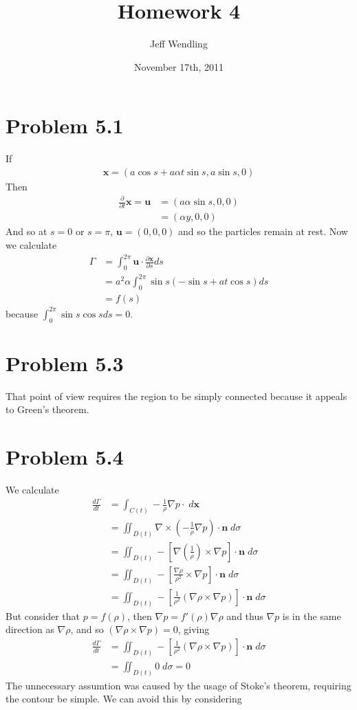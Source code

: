 \documentclass[12pt]{article}
\title{Homework 4}
\author{Jeff Wendling}
\date{November 17th, 2011}
\newcommand{\eq}[1]{\begin{align*}#1\end{align*}}
\newcommand{\p}[2]{\frac{\partial#1}{\partial#2}}
\newcommand{\de}[2]{\frac{d#1}{d#2}}
\begin{document}
\maketitle
\section*{Problem 5.1}
If
\eq{
	\bm{x} = (a\cos s + a\alpha t\sin s, a \sin s, 0)
}
Then
\eq{
	\p{}{t}\bm{x} = \bm{u} &= (a\alpha\sin s, 0, 0)\\
	&= (\alpha y, 0, 0)
}
And so at $s = 0$ or $s = \pi$, $\bm{u} = (0, 0, 0)$ and so the particles remain at rest.
Now we calculate
\eq{
	\Gamma &= \int_0^{2\pi} \bm{u}\cdot \p{\bm{x}}{s} ds\\
	&= a^2\alpha \int_0^{2\pi} \sin s(-\sin s + at\cos s)ds\\
	&= f(s)
}
because $\int_0^{2\pi} \sin s \cos s ds = 0$.
\section*{Problem 5.3}
That point of view requires the region to be simply connected because it appeals to Green's theorem.
\section*{Problem 5.4}
We calculate
\eq{
	\de{\Gamma}{t} &= \int_{C(t)} -\frac{1}{\rho}\nabla p \cdot\;d\bm{x}\\
	&= \iint_{D(t)} \nabla \times (-\frac{1}{\rho}\nabla p)\cdot \bm{n}\;d\sigma\\
	&= \iint_{D(t)} -\left[\nabla(\frac{1}{\rho}) \times \nabla p\right]\cdot \bm{n}\;d\sigma\\
	&= \iint_{D(t)} -\left[\frac{\nabla \rho}{\rho^2} \times \nabla p\right]\cdot \bm{n}\;d\sigma\\
	&= \iint_{D(t)} -\left[\frac{1}{\rho^2}(\nabla \rho \times \nabla p)\right]\cdot \bm{n}\;d\sigma
}
But consider that $p = f(\rho)$, then $\nabla p = f'(\rho)\nabla\rho$ and thus $\nabla p$ is in the same direction as $\nabla \rho$, and so $(\nabla \rho \times \nabla p) = 0$, giving
\eq{
	\de{\Gamma}{t} &= \iint_{D(t)} -\left[\frac{1}{\rho^2}(\nabla \rho \times \nabla p)\right]\cdot \bm{n}\;d\sigma\\
	&= \iint_{D(t)} 0 \; d\sigma = 0
}
The unnecessary assumtion was caused by the usage of Stoke's theorem, requiring the contour be simple. We can avoid this by considering
\eq{
	
}
\end{document}
